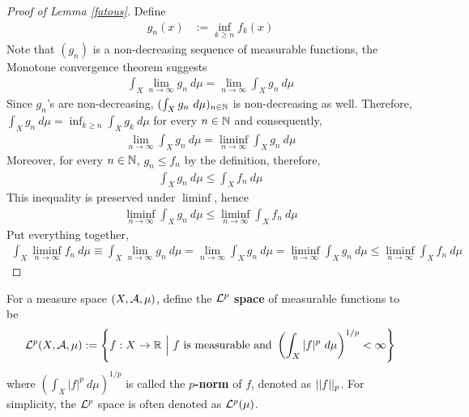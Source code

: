 \documentclass[11pt]{article}
\numberwithin{equation}{section}
\begin{document}
	\begin{proof}[Proof of Lemma \ref{fatous}]
	    Define
	    \begin{align}
	        g_n(x) &:= \inf_{k \geq n} f_k(x)
	    \end{align}
	    Note that $(g_n)$ is a non-decreasing sequence of measurable functions, the Monotone convergence theorem suggests
	    \begin{align}
	        \int_X \lim_{n \to \infty} g_n\ d\mu
	        = \lim_{n\to\infty} \int_X g_n\ d\mu
	    \end{align}
	    Since $g_n$'s are non-decreasing, $(\int_X g_n\ d\mu)_{n \in \mathbb{N}}$ is non-decreasing as well.
	    Therefore, $\int_X g_n\ d\mu = \inf_{k \geq n} \int_X g_k\ d\mu$ for every $n \in \mathbb{N}$ and consequently,
	    \begin{align}
	        \lim_{n\to\infty}\int_X g_n\ d\mu = \liminf_{n\to\infty}\int_X g_n\ d\mu
	    \end{align}
	    Moreover, for every $n \in \mathbb{N}$, $g_n \leq f_n$ by the definition, therefore,
	    \begin{align}
	        \int_X g_n\ d\mu \leq \int_X f_n\ d\mu
	    \end{align}
	    This inequality is preserved under $\liminf$, hence
	    \begin{align}
	        \liminf_{n\to\infty}\int_X g_n\ d\mu \leq \liminf_{n\to\infty}\int_X f_n\ d\mu
	    \end{align}
	    Put everything together, 
	    \begin{align}
	        \int_X \liminf_{n \to \infty}f_n\ d\mu
	        \equiv\int_X \lim_{n \to \infty} g_n\ d\mu
	        = \lim_{n\to\infty} \int_X g_n\ d\mu
	        = \liminf_{n\to\infty}\int_X g_n\ d\mu
	        \leq \liminf_{n\to\infty}\int_X f_n\ d\mu
	    \end{align}
	\end{proof}
	
	\begin{definition}
	    For a measure space $(X, \mathcal{{A}}, \mu)$, define the \textbf{$\mathcal{{L}}^p$ space} of measurable functions to be
	    \begin{align}
	        \mc{L}^p(X, \mc{A}, \mu) := 
	        \left\{
	            f: X \to \R\ \Big|\ 
	            f \tx{ is measurable and }
	            \left(\int_X |f|^p\ d\mu \right)^{1/p} < \infty
	        \right\}
	    \end{align}
	    where $\left(\int_X |f|^p\ d\mu \right)^{1/p}$ is called the \textbf{$p$-norm} of $f$, denoted as $\vert \vert {f} \vert \vert_p$. For simplicity, the $\mathcal{{L}}^p$ space is often denoted as $\mathcal{{L}}^p(\mu)$.
	\end{definition}
	
\end{document}
